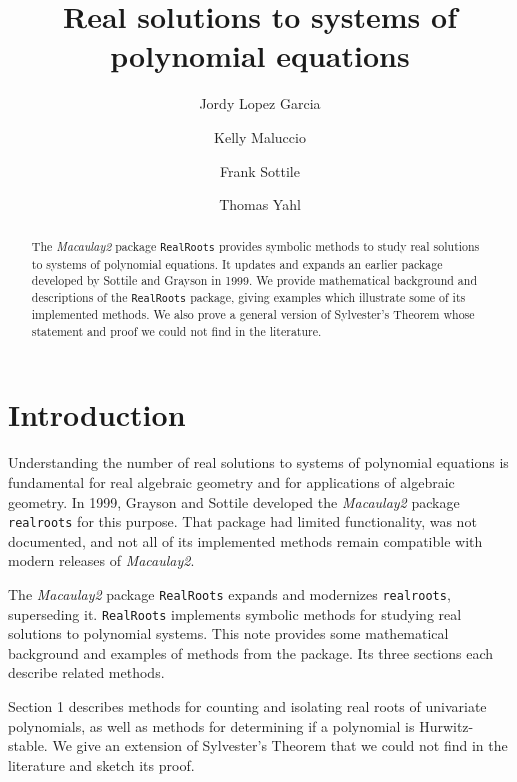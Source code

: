 \documentclass[12pt]{amsart}
\title{Real solutions to systems of polynomial equations}
\author[J.~Lopez Garcia]{Jordy Lopez Garcia}
\author[K.~Maluccio]{Kelly Maluccio}
\author[F.~Sottile]{Frank Sottile}
\author[T.~Yahl]{Thomas Yahl}
\theoremstyle{definition}
\begin{document}
\begin{abstract}
 The \textit{Macaulay2} package \texttt{RealRoots} provides symbolic methods to study real solutions to systems of polynomial equations.
 It updates and expands an earlier package developed by Sottile and Grayson in 1999.
 We provide mathematical background and descriptions of the  \texttt{RealRoots} package, giving examples which illustrate some of its
 implemented methods.
 We also prove a general version of Sylvester's Theorem whose statement and proof we could not find in the literature.
\end{abstract}

\maketitle


\section*{Introduction}


Understanding the number of real solutions to systems of polynomial equations is fundamental for real algebraic geometry and for
applications of algebraic geometry.
In 1999, Grayson and Sottile \cite{So_M2} developed the \textit{Macaulay2} package \texttt{realroots} for this purpose.
That package had limited functionality, was not documented, and not all of its implemented methods remain compatible with
modern releases of \textit{Macaulay2}. 

The \textit{Macaulay2} package \texttt{RealRoots} expands and modernizes \texttt{realroots}, superseding it.
\texttt{RealRoots} implements symbolic methods for studying real solutions to polynomial systems.
This note provides some mathematical background and examples of methods from the package.
Its  three sections each describe related methods.


Section 1 describes methods for counting and isolating real roots of univariate polynomials, as well as methods for determining if a
polynomial is Hurwitz-stable.
We give an extension of Sylvester's Theorem that we could not find in the literature and sketch its proof.
\end{document}
